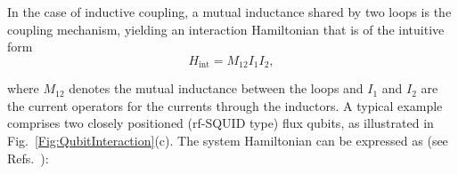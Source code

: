 \documentclass[aip,apr,twocolumn,showpacs,superscriptaddress,groupedaddress,nofootinbib,reprint]{revtex4-1}  %
\begin{document}
In the case of inductive coupling, a mutual inductance shared by two loops is the coupling mechanism, 
yielding an interaction Hamiltonian that
is of the intuitive form
%
\begin{equation}
H_{\text{int}} = M_{12} I_1 I_2,
\label{Eq:Mint}
\end{equation}

\noindent 
where $M_{12}$ denotes the mutual inductance between the loops and $I_1$ and $I_2$ are the current operators for the currents through the inductors. 
A typical example comprises two closely positioned (rf-SQUID type) flux qubits, as illustrated in Fig.~\ref{Fig:QubitInteraction}(c). The system Hamiltonian can be expressed as (see Refs.~):

%


\end{document}
